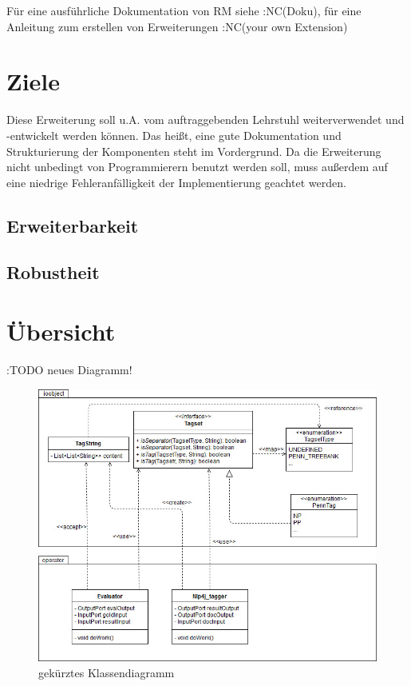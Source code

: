 Für eine ausführliche Dokumentation von RM siehe :NC(Doku), für eine Anleitung zum erstellen von Erweiterungen :NC(your own Extension)


\section{Ziele}
\label{sec:impl:aims}
Diese Erweiterung soll u.A. vom auftraggebenden Lehrstuhl weiterverwendet und -entwickelt werden können. Das heißt, eine gute Dokumentation und Strukturierung der Komponenten steht im Vordergrund. Da die Erweiterung nicht unbedingt von Programmierern benutzt werden soll, muss außerdem auf eine niedrige Fehleranfälligkeit der Implementierung geachtet werden.
\subsection{Erweiterbarkeit}
\subsection{Robustheit}


\section{Übersicht}
\label{sec:impl:structure}

:TODO neues Diagramm! 
\begin{figure}[htb]
	\includegraphics[width=\textwidth]{gfx/UML_Overview_simple.jpg}
	\caption{gekürztes Klassendiagramm}
	\label{fig:impl:structure:overview:uml}
\end{figure}

